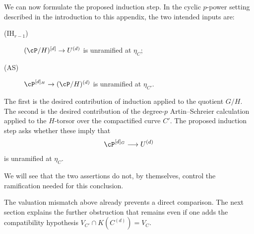 We can now formulate the proposed induction step.
In the cyclic $p$-power setting described in the introduction to this
appendix, the two intended inputs are:
\begin{description}
  \item[\textnormal{(IH$_{r-1}$)}]
    $(\cP/H)^{[d]}\to U^{(d)}$ is unramified at $\eta_C$;
  \item[\textnormal{(AS)}]
    $\cP^{[d]_H}\to(\cP/H)^{(d)}$ is unramified at $\eta_{C'}$.
\end{description}
The first is the desired contribution of induction applied to the quotient
$G/H$. The second is the desired contribution of the degree-$p$
Artin--Schreier calculation applied to the $H$-torsor over the compactified
curve $C'$. The proposed induction step asks whether these imply that
\[
\cP^{[d]_G}\longrightarrow U^{(d)}
\]
is unramified at $\eta_C$.
{\color{red}
We will see that the two assertions do not, by
themselves, control the ramification needed for this conclusion.
\par}
{\color{blue}
The valuation mismatch above already prevents a direct comparison. The
next section explains the further obstruction that remains even if one
adds the compatibility hypothesis
$V_{C'}\cap K(C^{(d)})=V_C$.
\par}

